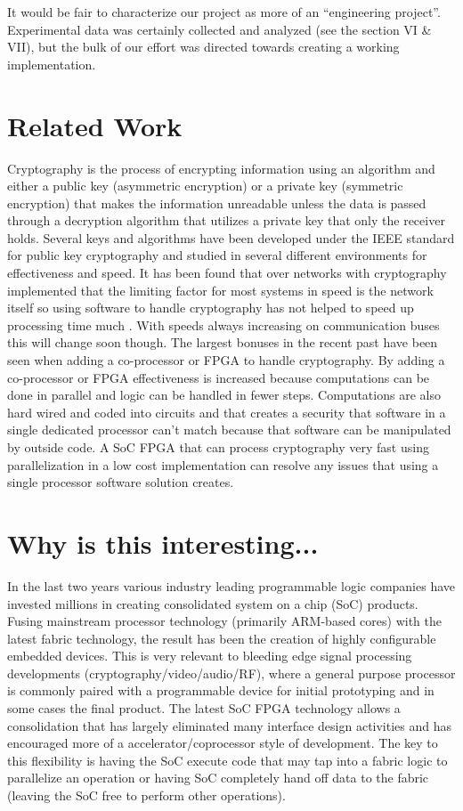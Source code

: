 \documentclass[journal]{IEEEtran}
\begin{document}
It would be fair to characterize our project as more of an “engineering project”.  Experimental data was certainly collected and analyzed (see the section VI \& VII), but the bulk of our effort was directed towards creating a working implementation.

\section{Related Work}
Cryptography is the process of encrypting information using an algorithm and either a public key (asymmetric encryption) or a private key (symmetric encryption) that makes the information unreadable unless the data is passed through a decryption algorithm that utilizes a private key that only the receiver holds\cite{HIPPA}. Several keys and algorithms have been developed under the IEEE standard for public key cryptography \cite{IEEESTD} and studied in several different environments for effectiveness and speed. It has been found that over networks with cryptography implemented that the limiting factor for most systems in speed is the network itself so using software to handle cryptography has not helped to speed up processing time much \cite{GUTMANN}. With speeds always increasing on communication buses this will change soon though. The largest bonuses in the recent past have been seen when adding a co-processor or FPGA to handle cryptography. By adding a co-processor or FPGA effectiveness is increased because computations can be done in parallel and logic can be handled in fewer steps\cite{GUERON}. Computations are also hard wired and coded into circuits and that creates a security that software in a single dedicated processor can’t match because that software can be manipulated by outside code\cite{GUTMANN}. A SoC FPGA that can process cryptography very fast using parallelization in a low cost implementation can resolve any issues that using a single processor software solution creates.

\section{Why is this interesting...}
In the last two years various industry leading programmable logic companies have invested millions in creating consolidated system on a chip (SoC) products. Fusing mainstream processor technology (primarily ARM-based cores) with the latest fabric technology, the result has been the creation of highly conﬁgurable embedded devices. This is very relevant to bleeding edge signal processing developments (cryptography/video/audio/RF), where a general purpose processor is commonly paired with a programmable device for initial prototyping and in some cases the ﬁnal product. The latest SoC FPGA technology allows a consolidation that has largely eliminated many interface design activities and has encouraged more of a accelerator/coprocessor style of development. The key to this ﬂexibility is having the SoC execute code that may tap into a fabric logic to parallelize an operation or having SoC completely hand off data to the fabric (leaving the SoC free to perform other operations).
\end{document}
